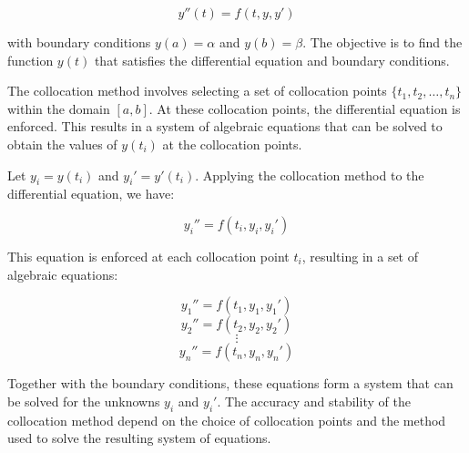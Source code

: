 \[
y''(t) = f(t, y, y')
\]

with boundary conditions \(y(a) = \alpha\) and \(y(b) = \beta\). The objective is to find the function \(y(t)\) that satisfies the differential equation and boundary conditions.

The collocation method involves selecting a set of collocation points \(\{t_1, t_2, \ldots, t_n\}\) within the domain \([a, b]\). At these collocation points, the differential equation is enforced. This results in a system of algebraic equations that can be solved to obtain the values of \(y(t_i)\) at the collocation points.

Let \(y_i = y(t_i)\) and \(y_i' = y'(t_i)\). Applying the collocation method to the differential equation, we have:

\[
y_i'' = f(t_i, y_i, y_i')
\]

This equation is enforced at each collocation point \(t_i\), resulting in a set of algebraic equations:

\[
y_1'' = f(t_1, y_1, y_1')
\]
\[
y_2'' = f(t_2, y_2, y_2')
\]
\[
\vdots
\]
\[
y_n'' = f(t_n, y_n, y_n')
\]

Together with the boundary conditions, these equations form a system that can be solved for the unknowns \(y_i\) and \(y_i'\). The accuracy and stability of the collocation method depend on the choice of collocation points and the method used to solve the resulting system of equations.



